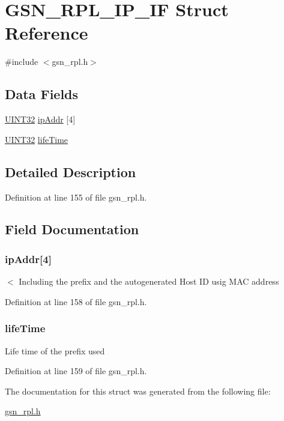 \hypertarget{a00203}{
\section{GSN\_\-RPL\_\-IP\_\-IF Struct Reference}
\label{a00203}
}


{\ttfamily \#include $<$gsn\_\-rpl.h$>$}

\subsection*{Data Fields}
\begin{DoxyCompactItemize}
\item 
\hyperlink{a00660_gae1e6edbbc26d6fbc71a90190d0266018}{UINT32} \hyperlink{a00203_a256f76569efac314525e387db8eb0af8}{ipAddr} \mbox{[}4\mbox{]}
\item 
\hyperlink{a00660_gae1e6edbbc26d6fbc71a90190d0266018}{UINT32} \hyperlink{a00203_ac3997c1e0e5e0acd04ecaaf8a2a45b3a}{lifeTime}
\end{DoxyCompactItemize}


\subsection{Detailed Description}


Definition at line 155 of file gsn\_\-rpl.h.



\subsection{Field Documentation}
\hypertarget{a00203_a256f76569efac314525e387db8eb0af8}{
\subsubsection[{ipAddr}]{ {\bf ipAddr}\mbox{[}4\mbox{]}}}
\label{a00203_a256f76569efac314525e387db8eb0af8}
$<$ Including the prefix and the autogenerated Host ID usig MAC address 

Definition at line 158 of file gsn\_\-rpl.h.

\hypertarget{a00203_ac3997c1e0e5e0acd04ecaaf8a2a45b3a}{
\subsubsection[{lifeTime}]{ {\bf lifeTime}}}
\label{a00203_ac3997c1e0e5e0acd04ecaaf8a2a45b3a}
Life time of the prefix used 

Definition at line 159 of file gsn\_\-rpl.h.



The documentation for this struct was generated from the following file:\begin{DoxyCompactItemize}
\item 
\hyperlink{a00579}{gsn\_\-rpl.h}\end{DoxyCompactItemize}
